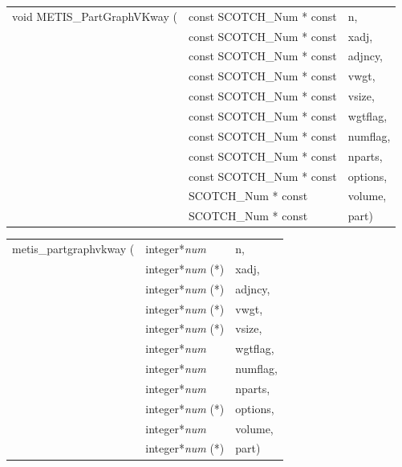 \begin{itemize}
\progsyn

{\tt\begin{tabular}{l@{}ll}
void METIS\_PartGraphVKway ( & const SCOTCH\_Num * const & n, \\
                             & const SCOTCH\_Num * const & xadj, \\
                             & const SCOTCH\_Num * const & adjncy, \\
                             & const SCOTCH\_Num * const & vwgt, \\
                             & const SCOTCH\_Num * const & vsize, \\
                             & const SCOTCH\_Num * const & wgtflag, \\
                             & const SCOTCH\_Num * const & numflag, \\
                             & const SCOTCH\_Num * const & nparts, \\
                             & const SCOTCH\_Num * const & options, \\
                             & SCOTCH\_Num * const       & volume, \\
                             & SCOTCH\_Num * const       & part)
\end{tabular}}

{\tt\begin{tabular}{l@{}ll}
metis\_partgraphvkway ( & integer*{\it num}     & n, \\
                        & integer*{\it num} (*) & xadj, \\
                        & integer*{\it num} (*) & adjncy, \\
                        & integer*{\it num} (*) & vwgt, \\
                        & integer*{\it num} (*) & vsize, \\
                        & integer*{\it num}     & wgtflag, \\
                        & integer*{\it num}     & numflag, \\
                        & integer*{\it num}     & nparts, \\
                        & integer*{\it num} (*) & options, \\
                        & integer*{\it num}     & volume, \\
                        & integer*{\it num} (*) & part)
\end{tabular}}


\end{itemize}
